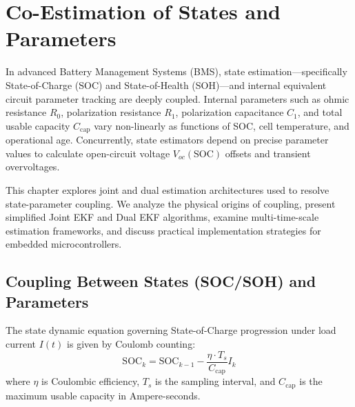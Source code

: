 \chapter{Co-Estimation of States and Parameters}
\label{ch:co_estimation}

In advanced Battery Management Systems (BMS), state estimation—specifically State-of-Charge (SOC) and State-of-Health (SOH)—and internal equivalent circuit parameter tracking are deeply coupled. Internal parameters such as ohmic resistance $R_0$, polarization resistance $R_1$, polarization capacitance $C_1$, and total usable capacity $C_{\text{cap}}$ vary non-linearly as functions of SOC, cell temperature, and operational age. Concurrently, state estimators depend on precise parameter values to calculate open-circuit voltage $V_{oc}(\text{SOC})$ offsets and transient overvoltages.

This chapter explores joint and dual estimation architectures used to resolve state-parameter coupling. We analyze the physical origins of coupling, present simplified Joint EKF and Dual EKF algorithms, examine multi-time-scale estimation frameworks, and discuss practical implementation strategies for embedded microcontrollers.


\section{Coupling Between States (SOC/SOH) and Parameters}
\label{sec:coupling_states_parameters}

The state dynamic equation governing State-of-Charge progression under load current $I(t)$ is given by Coulomb counting:
\begin{equation}
\text{SOC}_k = \text{SOC}_{k-1} - \frac{\eta \cdot T_s}{C_{\text{cap}}} I_k
\label{eq:ch7_soc_coulomb}
\end{equation}
where $\eta$ is Coulombic efficiency, $T_s$ is the sampling interval, and $C_{\text{cap}}$ is the maximum usable capacity in Ampere-seconds.

